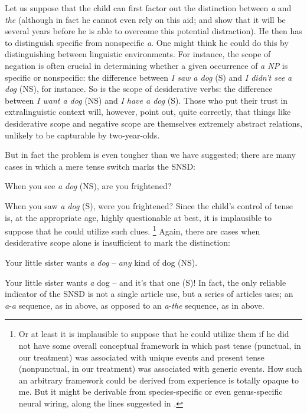 Let us suppose that the child can first factor out the distinction between \textit{a} and \textit{the} (although in fact he cannot even rely on this aid; \citet{Warden1976} and \citet{Karmiloff-Smith1979} show that it will be several years before he is able to overcome this potential distraction). He then has to distinguish specific from nonspecific \textit{a}. One might think he could do this by distinguishing between linguistic environ\-ments. For instance, the scope of negation is often crucial in determin\-ing whether a given occurrence of \textit{a NP} is specific or nonspecific: the difference between \textit{I saw a dog} (S) and \textit{I didn't see a dog} (NS), for instance. So is the scope of desiderative verbs: the difference between \textit{I want a dog} (NS) and \textit{I have a dog} (S). Those who put their trust in extralinguistic context will, however, point out, quite correctly, that things like desiderative scope and negative scope are themselves ex\-tremely abstract relations, unlikely to be capturable by two-year-olds.

But in fact the problem is even tougher than we have suggested; there are many cases in which a mere tense switch marks the SNSD:

\ea\label{ex:3:11}
 When you see \textit{a dog} (NS), are you frightened? 
\z

\ea\label{ex:3:12}
 When you saw \textit{a dog} (S), were you frightened? 
\z
Since the child's control of tense is, at the appropriate age, highly questionable at best, it is implausible to suppose that he could utilize such clues.%
\footnote{Or at least it is implausible to suppose that he could utilize them if he did not have some overall conceptual framework in which past tense (punctual, in our treatment) was associated with unique events and present tense (nonpunctual, in our treatment) was associ\-ated with generic events. How such an arbitrary framework could be derived from experience is totally opaque to me. But it might be derivable from species-specific or even genus-specific neural wiring, along the lines suggested in .}
Again, there are cases when desiderative scope alone is insufficient to mark the distinction:

\ea\label{ex:3:13}
 Your little sister wants \textit{a dog} -- \textit{any} kind of dog (NS). 
\z

\ea\label{ex:3:14}
 Your little sister wants \textit{a} dog -- and it's that one (S)! 
\z
In fact, the only reliable indicator of the SNSD is not a single article use, but a series of articles uses; an \textit{a}-\textit{a} sequence, as in  above, as opposed to an \textit{a}-\textit{the} sequence, as in  above.

